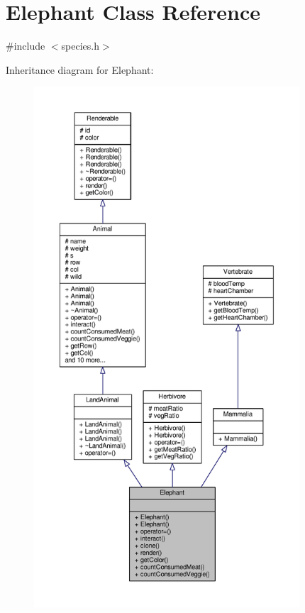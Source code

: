 \hypertarget{classElephant}{}\section{Elephant Class Reference}
\label{classElephant}


{\ttfamily \#include $<$species.\+h$>$}



Inheritance diagram for Elephant\+:
\nopagebreak
\begin{figure}[H]
\begin{center}
\leavevmode
\includegraphics[height=550pt]{classElephant__inherit__graph}
\end{center}
\end{figure}


